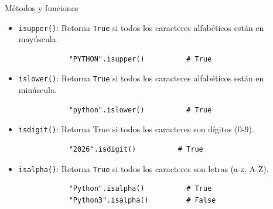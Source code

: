 \documentclass{beamer}
\begin{document}
    \begin{frame}[fragile,t]{Métodos y funciones}
        \begin{itemize}
            \item \texttt{isupper()}: Retorna \texttt{True} si todos los caracteres alfabéticos están en mayúscula.
            \begin{verbatim}
            "PYTHON".isupper()          # True
            \end{verbatim}
            \item \texttt{islower()}: Retorna \texttt{True} si todos los caracteres alfabéticos están en minúscula.
            \begin{verbatim}
            "python".islower()          # True
            \end{verbatim}
            \item \texttt{isdigit()}: Retorna True si todos los caracteres son dígitos (0-9).
            \begin{verbatim}
            "2026".isdigit()          # True
            \end{verbatim}
            \item \texttt{isalpha()}: Retorna \texttt{True} si todos los caracteres son letras (a-z, A-Z).
            \begin{verbatim}
            "Python".isalpha()          # True
            "Python3".isalpha()         # False
            \end{verbatim}
        \end{itemize}
    \end{frame}
\end{document}
